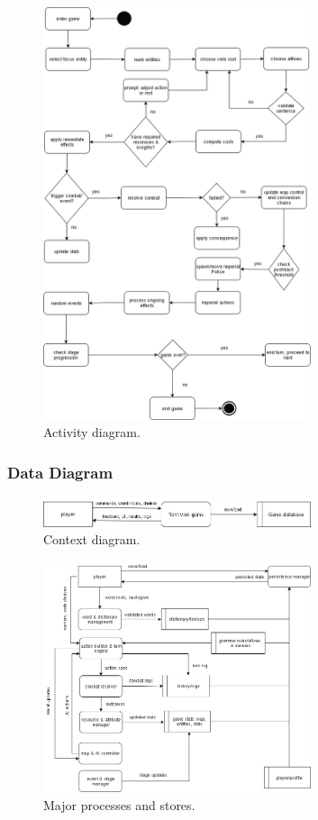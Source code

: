 \documentclass[11pt]{article}
\begin{document}
\begin{figure}[H]
  \centering
  \includegraphics[width=0.7\textwidth]{images/act.png}
  \caption{Activity diagram.}
  \label{fig:act}
\end{figure}

\subsubsection{Data Diagram}

\begin{figure}[H]
  \centering
  \includegraphics[width=0.7\textwidth]{images/dfd0.png}
  \caption{Context diagram.}
  \label{fig:dfd0}
\end{figure}

\begin{figure}[H]
  \centering
  \includegraphics[width=0.7\textwidth]{images/dfd1.png}
  \caption{Major processes and stores.}
  \label{fig:dfd1}
\end{figure}
\end{document}
